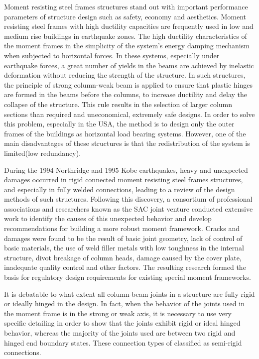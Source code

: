 Moment resisting steel frames structures stand out with important
performance parameters of structure design such as safety, economy
and aesthetics. Moment resisting steel frames with high ductility
capacities are frequently used in low and medium rise buildings in
earthquake zones. The high ductility characteristics of the moment
frames in the simplicity of the system's energy damping mechanism
when subjected to horizontal forces. In these systems, especially
under earthquake forces, a great number of yields in the beams are
achieved by inelastic deformation without reducing the strength of
the structure. In such structures, the principle of strong column-weak
beam is applied to ensure that plastic hinges are formed in the beams
before the columns, to increase ductility and delay the collapse of
the structure. This rule results in the selection of larger column
sections than required and uneconomical, extremely safe designs. In
order to solve this problem, especially in the USA, the method is
to design only the outer frames of the buildings as horizontal load
bearing systems. However, one of the main disadvantages of these structures
is that the redistribution of the system is limited(low redundancy).

During the 1994 Northridge and 1995 Kobe earthquakes, heavy and unexpected
damages occurred in rigid connected moment resisting steel frames
structures, and especially in fully welded connections, leading to
a review of the design methods of such structures. Following this
discovery, a consortium of professional associations and researchers
known as the SAC joint venture conducted extensive work to identify
the causes of this unexpected behavior and develop recommendations
for building a more robust moment framework. Cracks and damages were
found to be the result of basic joint geometry, lack of control of
basic materials, the use of weld filler metals with low toughness
in the internal structure, divot breakage of column heads, damage
caused by the cover plate, inadequate quality control and other factors.
The resulting research formed the basis for regulatory design requirements
for existing special moment frameworks.

It is debatable to what extent all column-beam joints in a structure
are fully rigid or ideally hinged in the design. In fact, when the
behavior of the joints used in the moment frame is in the strong or
weak axis, it is necessary to use very specific detailing in order
to show that the joints exhibit rigid or ideal hinged behavior, whereas
the majority of the joints used are between two rigid and hinged end
boundary states. These connection types of classified as semi-rigid
connections.

